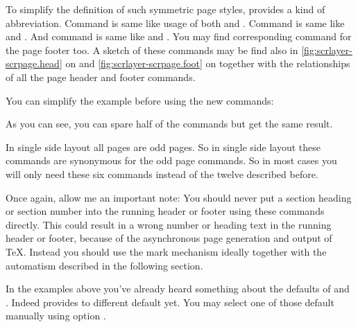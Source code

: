 To simplify the definition of such symmetric page styles,
 provides a kind of abbreviation. Command
 is same like usage of both  and
. Command  is same like  and
. And command  is same like  and
. You may find corresponding command for the page footer too. A
sketch of these commands may be find also in
\autoref{fig:scrlayer-scrpage.head} on 
and \autoref{fig:scrlayer-scrpage.foot} on
 together with the relationships of all
the page header and footer commands.
%
\begin{Example}
  You can simplify the example before using the new commands:
  As you can see, you can spare half of the commands but get the same result.
\end{Example}
%
In single side layout all pages are odd pages. So in single side layout these
commands are synonymous for the odd page commands. So in most cases you will
only need these six commands instead of the twelve described before.

Once again, allow me an important note: You should never
put a section heading or section number into the running header or footer
using these commands directly. This could result in a wrong number or heading
text in the running header or footer, because of the asynchronous page
generation and output of \TeX. Instead you should use the mark mechanism
ideally together with the automatism described in the following section.%
%
%
%
%
%
%


\begin{Declaration}
\end{Declaration}
%
%
In the examples above you've already heard something about the defaults of
 and
. Indeed
 provides to different default yet. You may select
one of those default manually using option .

